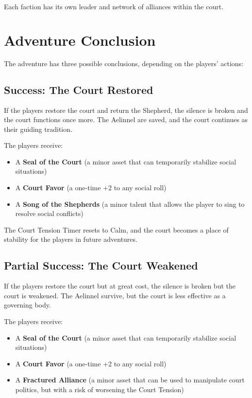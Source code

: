 \documentclass{article}
\begin{document}
Each faction has its own leader and network of alliances within the court.

\section{Adventure Conclusion}

The adventure has three possible conclusions, depending on the players' actions:

\subsection{Success: The Court Restored}

If the players restore the court and return the Shepherd, the silence is broken and the court functions once more. The Aelinnel are saved, and the court continues as their guiding tradition.

The players receive:
\begin{itemize}
    \item A \textbf{Seal of the Court} (a minor asset that can temporarily stabilize social situations)
    \item A \textbf{Court Favor} (a one-time +2 to any social roll)
    \item A \textbf{Song of the Shepherds} (a minor talent that allows the player to sing to resolve social conflicts)
\end{itemize}

The Court Tension Timer resets to Calm, and the court becomes a place of stability for the players in future adventures.

\subsection{Partial Success: The Court Weakened}

If the players restore the court but at great cost, the silence is broken but the court is weakened. The Aelinnel survive, but the court is less effective as a governing body.

The players receive:
\begin{itemize}
    \item A \textbf{Seal of the Court} (a minor asset that can temporarily stabilize social situations)
    \item A \textbf{Court Favor} (a one-time +2 to any social roll)
    \item A \textbf{Fractured Alliance} (a minor asset that can be used to manipulate court politics, but with a risk of worsening the Court Tension)
\end{itemize}
\end{document}
